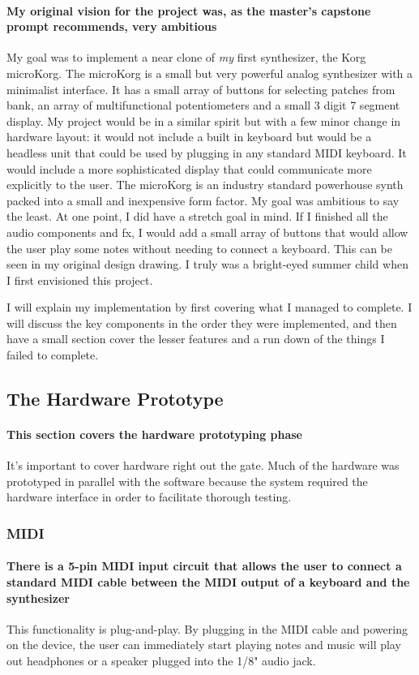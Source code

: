 \documentclass[acmlarge,screen]{acmart}
\begin{document}
	\paragraph{My original vision for the project was, as the master's capstone prompt recommends, very ambitious} My goal was to implement a near clone of \textit{my} first synthesizer, the Korg microKorg. The microKorg is a small but very powerful analog synthesizer with a minimalist interface. It has a small array of buttons for selecting patches from bank, an array of multifunctional potentiometers and a small 3 digit 7 segment display. My project would be in a similar spirit but with a few minor change in hardware layout: it would not include a built in keyboard but would be a headless unit that could be used by plugging in any standard MIDI keyboard. It would include a more sophisticated display that could communicate more explicitly to the user. The microKorg is an industry standard powerhouse synth packed into a small and inexpensive form factor. My goal was ambitious to say the least. At one point, I did have a stretch goal in mind. If I finished all the audio components and fx, I would add a small array of buttons that would allow the user play some notes without needing to connect a keyboard. This can be seen in my original design drawing. I truly was a bright-eyed summer child when I first envisioned this project.

	I will explain my implementation by first covering what I managed to complete. I will discuss the key components in the order they were implemented, and then have a small section cover the lesser features and a run down of the things I failed to complete.

\subsection{The Hardware Prototype}
	\paragraph{This section covers the hardware prototyping phase} It's important to cover hardware right out the gate. Much of the hardware was prototyped in parallel with the software because the system required the hardware interface in order to facilitate thorough testing.

	\subsubsection{MIDI}
	\paragraph{There is a 5-pin MIDI input circuit that allows the user to connect a standard MIDI cable between the MIDI output of a keyboard and the synthesizer} This functionality is plug-and-play. By plugging in the MIDI cable and powering on the device, the user can immediately start playing notes and music will play out headphones or a speaker  plugged into the 1/8" audio jack.
\end{document}
